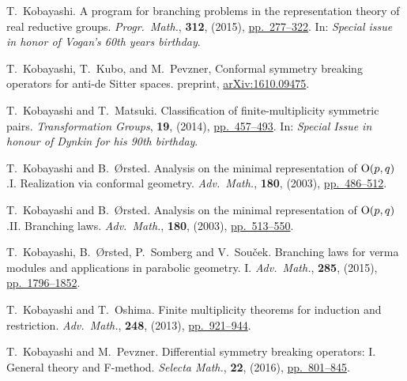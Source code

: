 \documentclass[reqno,12pt]{pja00} %
\theoremstyle{definition}
\theoremstyle{exampstyle} \newtheorem{examp}[theorem]{Theorem}
\begin{document}
\begin{thebibliography}{14}
T.~Kobayashi.
\newblock A program for branching problems in the representation theory of real
  reductive groups.
\newblock \emph{{\normalfont Progr.~Math.}}, \textbf{312}, (2015), 
\href{http://dx.doi.org/10.1007/978-3-319-23443-4_10}{pp.~277--322}.
\newblock In: \emph{{\normalfont Special issue in honor of Vogan's 60th years
  birthday}}.

T.~Kobayashi, T.~Kubo, and M.~Pevzner,
\newblock 
Conformal symmetry breaking operators for anti-de Sitter spaces.
preprint, 
\href{https://arxiv.org/abs/1610.09475}{arXiv:1610.09475}.

T.~Kobayashi and T.~Matsuki.
\newblock Classification of finite-multiplicity symmetric pairs.
\newblock \emph{{\normalfont Transformation Groups}}, \textbf{19}, (2014),
\href{http://dx.doi.org/10.1007/s00031-014-9265-x}{pp.~457--493}.
\newblock In: \emph{{\normalfont Special Issue in honour of Dynkin
  for his 90th birthday}}.


T.~Kobayashi and B.~{\O}rsted.
\newblock Analysis on the minimal representation of\/ {${\rm
  O}(p,q)$}.{\;}{{\rm{I}}. Realization via conformal geometry}.
\newblock \emph{\normalfont Adv.~Math.}, \textbf{180}, (2003),
\href{http://dx.doi.org/10.1016/S0001-8708(03)00012-4}{pp.~486--512}.

T.~Kobayashi and B.~{\O}rsted.
\newblock Analysis on the minimal representation of\/ {${\rm O}(p,q)$}.{\;}{{\rm{II}}}. {B}ranching laws.
\newblock \emph{\normalfont Adv.~Math.}, \textbf{180}, (2003),
\href{http://dx.doi.org/10.1016/S0001-8708(03)00013-6}{pp.~513--550}.

T.~Kobayashi, B.~{\O}rsted, P.~Somberg and V.~Sou{\v{c}}ek.
\newblock Branching laws for verma modules and applications in parabolic
  geometry. {I}.
\newblock \emph{{\normalfont Adv.~Math.}}, \textbf{285}, (2015),
\href{http://dx.doi.org/10.1016/j.aim.2015.08.020}{pp.~1796--1852}.

T.~Kobayashi and T.~Oshima.
\newblock Finite multiplicity theorems for induction and restriction.
\newblock \emph{{\normalfont Adv.~Math.}}, \textbf{248}, (2013), 
 \href{http://dx.doi.org/10.1016/j.aim.2013.07.015}{pp.~921--944}.

T.~Kobayashi and M.~Pevzner.
\newblock Differential symmetry breaking operators: I. {G}eneral theory and
  {F}-method.
\newblock \emph{{\normalfont Selecta Math.}}, \textbf{22}, (2016),
\href{http://dx.doi.org/10.1007/s00029-015-0207-9}{pp.~801--845}.


\end{thebibliography}
\end{document}
